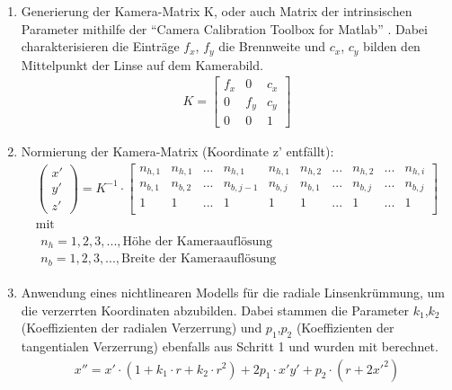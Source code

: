 \begin{enumerate}
	\item Generierung der Kamera-Matrix K, oder auch Matrix der intrinsischen Parameter mithilfe der "`Camera Calibration Toolbox for Matlab"' \citep{Calib}. Dabei charakterisieren die Einträge $f_x$, $f_y$ die Brennweite und $c_x$, $c_y$ bilden den Mittelpunkt der Linse  auf dem Kamerabild.
	\begin{align*}
	K = \begin{bmatrix}
	f_x &  0 & c_x\\ 
	0 & f_y & c_y\\ 
	0 & 0 & 1
	\end{bmatrix}
	\end{align*}  
	\item Normierung der Kamera-Matrix (Koordinate z' entfällt): 
	\setcounter{MaxMatrixCols}{20} 
	\begin{gather*}
	\begin{pmatrix} x'\\ y'\\ z' \end{pmatrix} = K^{-1} \cdot 
	\begin{bmatrix}
	n_{h,1} & n_{h,1} & ... & n_{h,1} & n_{h,1} & n_{h,2} & ... & n_{h,2} & ... & n_{h,i}\\
	n_{b,1} & n_{b,2} & ... & n_{b,j-1} & n_{b,j} & n_{b,1} & ... & n_{b,j} & ... & n_{b,j}\\
	1 & 1 & ... & 1 & 1 & 1 & ... & 1 & ... & 1\\
	\end{bmatrix} \\[1mm] \text{mit} \\[1mm]
	\begin{matrix}
	n_{h} = 1,2,3,..., \text{Höhe der Kameraauflösung}\\ 
	n_{b} = 1,2,3,..., \text{Breite der Kameraauflösung}
	\end{matrix}
	\end{gather*}
	\item Anwendung eines nichtlinearen Modells für die radiale Linsenkrümmung, um die verzerrten Koordinaten abzubilden. Dabei stammen die Parameter $k_1$,$k_2$ (Koeffizienten der radialen Verzerrung) und  $p_1$,$p_2$ (Koeffizienten der tangentialen Verzerrung) ebenfalls aus Schritt 1 und wurden mit \citep{Calib} berechnet.
	\begin{gather*}
	{x}'' = x'\cdot \left ( 1+k_1\cdot r + k_2\cdot r^2 \right )+2 p_1\cdot x'y'+p_2\cdot \left ( r+2{x}'^2 \right )\\

\end{gather*}
\end{enumerate}
